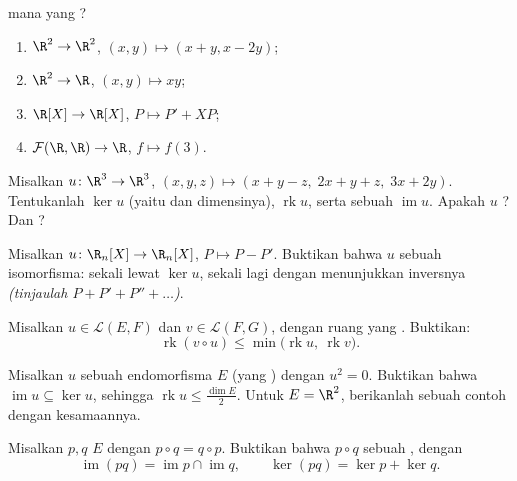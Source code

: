 \begin{exercise}[$\star$]\label{exo:b1:linmaps:1}
 mana yang ?
\begin{enumerate}
  \item $\R^2 \to \R^2$, $(x, y) \mapsto (x + y, x - 2y)$;
  \item $\R^2 \to \R$, $(x, y) \mapsto xy$;
  \item $\R[X] \to \R[X]$, $P \mapsto P' + XP$;
  \item $\mathcal{F}(\R,\R) \to \R$, $f \mapsto f(3)$.
\end{enumerate}
\end{exercise}

\begin{exercise}[$\star$]\label{exo:b1:linmaps:2}
Misalkan $u \colon \R^3 \to \R^3$, $(x,y,z) \mapsto (x + y - z,\; 2x + y
+ z,\; 3x + 2y)$. Tentukanlah $\ker u$ (yaitu  dan dimensinya),
$\operatorname{rk} u$, serta sebuah  $\operatorname{im} u$. Apakah $u$
? Dan ?
\end{exercise}

\begin{exercise}[$\star$]\label{exo:b1:linmaps:3}
Misalkan $u \colon \R_n[X] \to \R_n[X]$, $P \mapsto P - P'$. Buktikan bahwa
$u$ sebuah isomorfisma: sekali lewat $\ker u$, sekali lagi dengan menunjukkan
inversnya \emph{(tinjaulah $P + P' + P'' + \dots$)}.
\end{exercise}

\begin{exercise}[$\star$]\label{exo:b1:linmaps:4}
Misalkan $u \in \mathcal{L}(E, F)$ dan $v \in \mathcal{L}(F, G)$, dengan ruang yang
. Buktikan:
\[
\operatorname{rk}(v \circ u) \leq
\min\bigl(\operatorname{rk} u,\ \operatorname{rk} v\bigr).
\]
\end{exercise}

\begin{exercise}[$\star\star$]\label{exo:b1:linmaps:5}
Misalkan $u$ sebuah endomorfisma $E$ (yang ) dengan $u^2 =
0$. Buktikan bahwa $\operatorname{im} u \subseteq \ker u$, sehingga
$\operatorname{rk} u \leq \frac{\dim E}{2}$. Untuk $E = \R^2$, berikanlah sebuah
contoh dengan kesamaannya.
\end{exercise}

\begin{exercise}[$\star\star$]\label{exo:b1:linmaps:6}
Misalkan $p, q$  $E$ dengan $p \circ q = q \circ p$.
Buktikan bahwa $p \circ q$ sebuah , dengan
\[
\operatorname{im}(pq) = \operatorname{im} p \cap \operatorname{im}
q ,
\qquad
\ker (pq) = \ker p + \ker q .
\]
\end{exercise}

